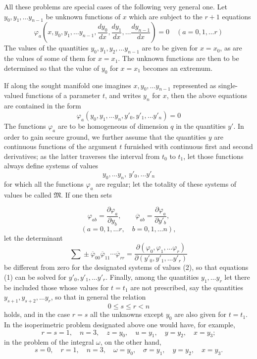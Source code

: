 \documentclass[11pt,a4paper,leqno]{article}
\begin{document}
All these problems are special cases of the following very general one.
Let $y_0,y_1,\ldots y_{n-1}$ be unknown functions of $x$ which are subject
to the $r+1$ equations
\[
\varphi_a\left(x,y_0,y_1,\ldots y_{n-1},
\frac{dy_0}{dx},\frac{dy_1}{dx},\ldots\frac{dy_{n-1}}{dx}\right)=0
\quad(a=0,1,\ldots r)
\]
The values of the quantities $y_0,y_1,y_2,\ldots y_{n-1}$ are to be given
for $x=x_0$, as are the values of some of them for $x=x_1$. The unknown
functions are then to be determined so that the value of $y_0$ for $x=x_1$
becomes an extremum.

If along the sought manifold one imagines $x,y_0,\ldots y_{n-1}$ represented
as single-valued functions of a parameter $t$, and writes $y_n$ for $x$,
then the above equations are contained in the form
\begin{equation}\tag{1}
\varphi_a(y_0,y_1,\ldots y_n,y'_0,y'_1,\ldots y'_n)=0
\end{equation}
The functions $\varphi_a$ are to be homogeneous of dimension $q$ in the
quantities $y'$. In order to gain secure ground, we further assume that the
quantities $y$ are continuous functions of the argument $t$ furnished with
continuous first and second derivatives; as the latter traverses the
interval from $t_0$ to $t_1$, let those functions always define systems of
values
\begin{equation}\tag{2}
y_0,\ldots y_n,\ y'_0,\ldots y'_n
\end{equation}
for which all the functions $\varphi_a$ are regular; let the totality of
these systems of values be called $\mathfrak M$. If one then sets

\[
\varphi_{ab}=\frac{\partial\varphi_a}{\partial y_b},\qquad
\overline{\varphi}_{ab}=\frac{\partial\varphi_a}{\partial y'_b},
\]
\[
(a=0,1,\ldots r,\quad b=0,1,\ldots n),
\]
let the determinant
\begin{equation}\tag{3}
\sum\!\pm\overline{\varphi}_{00}\overline{\varphi}_{11}
\cdots\overline{\varphi}_{rr}
=\frac{\partial(\varphi_0,\varphi_1,\ldots\varphi_r)}
{\partial(y'_0,y'_1,\ldots y'_r)}
\end{equation}
be different from zero for the designated systems of values (2), so that
equations (1) can be solved for $y'_0,y'_1,\ldots y'_r$. Finally, among the
quantities $y_1,\ldots y_r$ let there be included those whose values for
$t=t_1$ are not prescribed, say the quantities
$y_{s+1},y_{s+2},\ldots y_r$, so that in general the relation
\[
0\leq s\leq r<n
\]
holds, and in the case $r=s$ all the unknowns except $y_0$ are also given
for $t=t_1$. In the isoperimetric problem designated above one would have,
for example,
\[
r=s=1,\quad n=3,\quad z=y_0,\quad u=y_1,\quad y=y_2,\quad x=y_3;
\]
in the problem of the integral $\omega$, on the other hand,
\[
s=0,\quad r=1,\quad n=3,\quad \omega=y_0,\quad \sigma=y_1,
\quad y=y_2,\quad x=y_3.
\]
\end{document}
